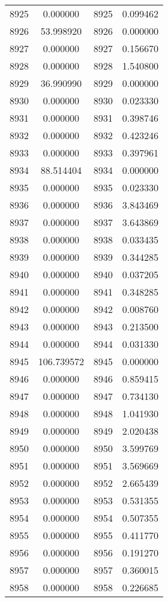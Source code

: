 \documentclass[12pt]{article}
\begin{document}
\begin{longtable}{@{}cccc@{}}
8925 & 0.000000 & 8925 & 0.099462 \\
8926 & 53.998920 & 8926 & 0.000000 \\
8927 & 0.000000 & 8927 & 0.156670 \\
8928 & 0.000000 & 8928 & 1.540800 \\
8929 & 36.990990 & 8929 & 0.000000 \\
8930 & 0.000000 & 8930 & 0.023330 \\
8931 & 0.000000 & 8931 & 0.398746 \\
8932 & 0.000000 & 8932 & 0.423246 \\
8933 & 0.000000 & 8933 & 0.397961 \\
8934 & 88.514404 & 8934 & 0.000000 \\
8935 & 0.000000 & 8935 & 0.023330 \\
8936 & 0.000000 & 8936 & 3.843469 \\
8937 & 0.000000 & 8937 & 3.643869 \\
8938 & 0.000000 & 8938 & 0.033435 \\
8939 & 0.000000 & 8939 & 0.344285 \\
8940 & 0.000000 & 8940 & 0.037205 \\
8941 & 0.000000 & 8941 & 0.348285 \\
8942 & 0.000000 & 8942 & 0.008760 \\
8943 & 0.000000 & 8943 & 0.213500 \\
8944 & 0.000000 & 8944 & 0.031330 \\
8945 & 106.739572 & 8945 & 0.000000 \\
8946 & 0.000000 & 8946 & 0.859415 \\
8947 & 0.000000 & 8947 & 0.734130 \\
8948 & 0.000000 & 8948 & 1.041930 \\
8949 & 0.000000 & 8949 & 2.020438 \\
8950 & 0.000000 & 8950 & 3.599769 \\
8951 & 0.000000 & 8951 & 3.569669 \\
8952 & 0.000000 & 8952 & 2.665439 \\
8953 & 0.000000 & 8953 & 0.531355 \\
8954 & 0.000000 & 8954 & 0.507355 \\
8955 & 0.000000 & 8955 & 0.411770 \\
8956 & 0.000000 & 8956 & 0.191270 \\
8957 & 0.000000 & 8957 & 0.360015 \\
8958 & 0.000000 & 8958 & 0.226685 \\

\end{longtable}
\end{document}
